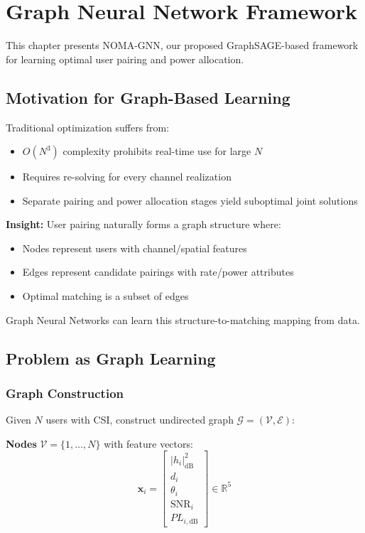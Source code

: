 \chapter{Graph Neural Network Framework}
\label{chap:gnn}

This chapter presents NOMA-GNN, our proposed GraphSAGE-based framework for learning optimal user pairing and power allocation.

\section{Motivation for Graph-Based Learning}

Traditional optimization suffers from:
\begin{itemize}
    \item $O(N^3)$ complexity prohibits real-time use for large $N$
    \item Requires re-solving for every channel realization
    \item Separate pairing and power allocation stages yield suboptimal joint solutions
\end{itemize}

\textbf{Insight:} User pairing naturally forms a graph structure where:
\begin{itemize}
    \item Nodes represent users with channel/spatial features
    \item Edges represent candidate pairings with rate/power attributes
    \item Optimal matching is a subset of edges
\end{itemize}

Graph Neural Networks can learn this structure-to-matching mapping from data.

\section{Problem as Graph Learning}

\subsection{Graph Construction}

Given $N$ users with CSI, construct undirected graph $\mathcal{G} = (\mathcal{V}, \mathcal{E})$:

\textbf{Nodes} $\mathcal{V} = \{1, \ldots, N\}$ with feature vectors:
\begin{equation}
\mathbf{x}_i = \begin{bmatrix}
|h_i|^2_{\text{dB}} \\
d_i \\
\theta_i \\
\text{SNR}_i \\
PL_{i,\text{dB}}
\end{bmatrix} \in \mathbb{R}^5
\end{equation}

